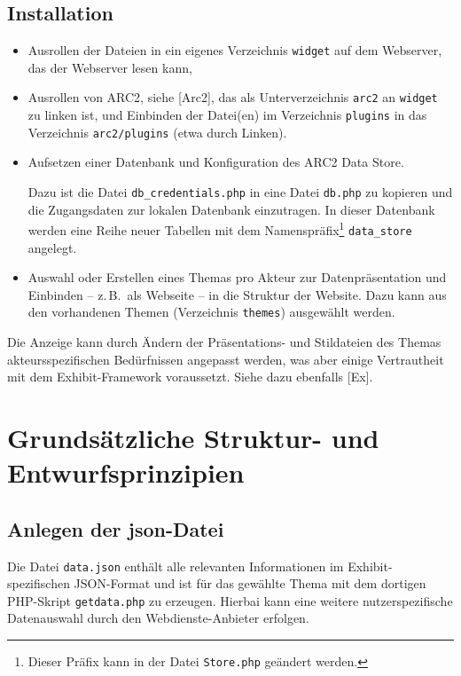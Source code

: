 \documentclass[11pt,a4paper]{article}
\begin{document}
\subsection{Installation}

\begin{itemize}
\item Ausrollen der Dateien in ein eigenes Verzeichnis \texttt{widget} auf dem
  Webserver, das der Webserver lesen kann,
\item Ausrollen von ARC2, siehe [Arc2], das als Unterverzeichnis \texttt{arc2}
  an \texttt{widget} zu linken ist, und Einbinden der Datei(en) im Verzeichnis
  \texttt{plugins} in das Verzeichnis \texttt{arc2/plugins} (etwa durch
  Linken).
\item Aufsetzen einer Datenbank und Konfiguration des ARC2 Data Store. 

  Dazu ist die Datei \texttt{db\_credentials.php} in eine Datei
  \texttt{db.php} zu kopieren und die Zugangsdaten zur lokalen Datenbank
  einzutragen. In dieser Datenbank werden eine Reihe neuer Tabellen mit dem
  Namenspräfix\footnote{Dieser Präfix kann in der Datei \texttt{Store.php}
    geändert werden.} \texttt{data\_store} angelegt.
\item Auswahl oder Erstellen eines Themas pro Akteur zur Datenpräsentation und
  Einbinden -- z.\,B.\ als Webseite -- in die Struktur der Website.  Dazu kann
  aus den vorhandenen Themen (Verzeichnis \texttt{themes}) ausgewählt werden. 
\end{itemize}
Die Anzeige kann durch Ändern der Präsentations- und Stildateien des Themas
akteurs\-spezifischen Bedürfnissen angepasst werden, was aber einige
Vertrautheit mit dem Exhibit-Framework voraussetzt.  Siehe dazu ebenfalls
[Ex].

\section{Grundsätzliche Struktur- und Entwurfsprinzipien}

\subsection{Anlegen der json-Datei}

Die Datei \texttt{data.json} enthält alle relevanten Informationen im
Exhibit-spezifischen JSON-Format und ist für das gewählte Thema mit dem
dortigen PHP-Skript \texttt{getdata.php} zu erzeugen.  Hierbai kann eine
weitere nutzerspezifische Datenauswahl durch den Webdienste-Anbieter erfolgen.
\end{document}
